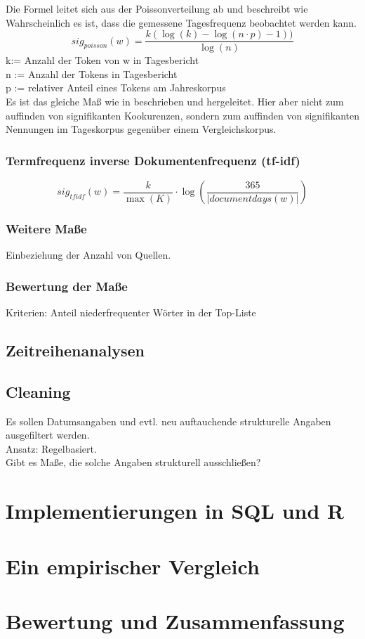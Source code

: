 Die Formel leitet sich aus der Poissonverteilung ab und beschreibt wie Wahrscheinlich es ist, dass die gemessene Tagesfrequenz beobachtet werden kann. 
\begin{equation}
sig_{poisson}(w) = \frac{k(\log(k)-\log(n\cdot p) -1 ))}{\log(n)}
\end{equation}
k:= Anzahl der Token von w in Tagesbericht\\
n := Anzahl der Tokens in Tagesbericht\\
p := relativer Anteil eines Tokens am Jahreskorpus\\
Es ist das gleiche Maß wie in \cite[S. 338-340]{heyer06} beschrieben und hergeleitet. Hier aber nicht zum auffinden von signifikanten Kookurenzen, sondern zum auffinden von signifikanten Nennungen im Tageskorpus gegenüber einem Vergleichskorpus.\\

\subsection{Termfrequenz inverse Dokumentenfrequenz (tf-idf)}
 \begin{equation}
sig_{tf idf}(w) = \frac{k}{\max(K)} \cdot \log ( \frac{365}{|documentdays(w)|})
\end{equation}

\subsection{Weitere Maße}
Einbeziehung der Anzahl von Quellen.
\subsection{Bewertung der Ma\ss e}
Kriterien: Anteil niederfrequenter Wörter in der Top-Liste\\

\section{Zeitreihenanalysen}
\section{Cleaning}
Es sollen Datumsangaben und evtl. neu auftauchende strukturelle Angaben ausgefiltert werden.\\
Ansatz: Regelbasiert.\\
Gibt es Maße, die solche Angaben strukturell ausschließen?


\chapter{Implementierungen in SQL und R}
\chapter{Ein empirischer Vergleich}

\chapter{Bewertung und Zusammenfassung}











 
\nocite{*}%
 


